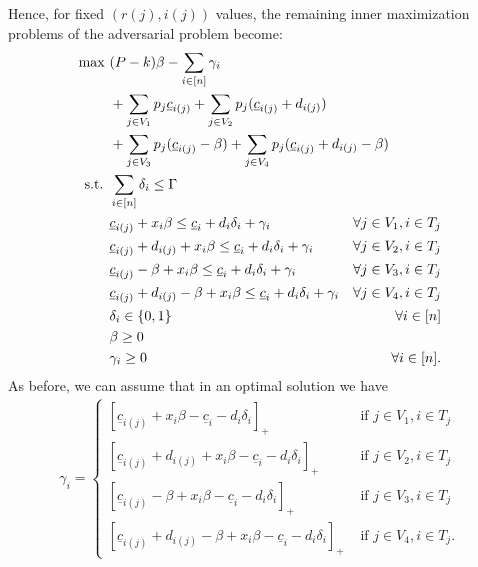 Hence, for fixed $(r(j),i(j))$ values, 
the remaining inner maximization problems of the adversarial problem become:
\begin{align}
\label{eq:complicated-rj-ij}
\max\ & (P-k)\beta - \sum_{i\in[n]} \gamma_i \\
& + \sum_{j\in V_1} p_j \underline{c}_{i(j)}
+ \sum_{j\in V_2} p_j (\underline{c}_{i(j)} + d_{i(j)}) \nonumber \\
& + \sum_{j\in V_3} p_j (\underline{c}_{i(j)} - \beta)
+ \sum_{j\in V_4} p_j (\underline{c}_{i(j)} + d_{i(j)} - \beta) \hspace{-4cm} \nonumber\\
\text{s.t. } & \sum_{i\in[n]} \delta_i \le \Gamma \nonumber\\
& \underline{c}_{i(j)} + x_i \beta \le \underline{c}_i + d_i\delta_i + \gamma_i & \forall j\in V_1, i\in T_j \nonumber\\
& \underline{c}_{i(j)} + d_{i(j)} + x_i \beta \le \underline{c}_i + d_i\delta_i + \gamma_i & \forall j\in V_2, i\in T_j \nonumber\\
& \underline{c}_{i(j)} -\beta + x_i \beta \le \underline{c}_i + d_i\delta_i + \gamma_i & \forall j\in V_3, i\in T_j \nonumber\\
& \underline{c}_{i(j)} + d_{i(j)} - \beta + x_i \beta \le \underline{c}_i + d_i\delta_i + \gamma_i & \forall j\in V_4, i\in T_j \nonumber\\
& \delta_i\in\{0,1\} & \forall i\in[n] \nonumber\\
& \beta \ge 0 \nonumber\\
& \gamma_i \ge 0 & \forall i\in[n]. \nonumber
\end{align}
As before, we can assume that in an optimal solution we have
\begin{align}
\label{eq:gamma-rj-ij}
\gamma_i = \begin{cases}
[\underline{c}_{i(j)} + x_i \beta - \underline{c}_i - d_i\delta_i]_+ & \text{ if } j\in V_1, i \in T_j \\
[\underline{c}_{i(j)} + d_{i(j)} + x_i \beta - \underline{c}_i - d_i\delta_i]_+ & \text{ if } j\in V_2, i \in T_j \\
[\underline{c}_{i(j)} -\beta + x_i \beta - \underline{c}_i - d_i\delta_i]_+ & \text{ if } j\in V_3, i \in T_j \\
[\underline{c}_{i(j)} + d_{i(j)} - \beta + x_i \beta - \underline{c}_i - d_i\delta_i]_+ & \text{ if } j\in V_4, i \in T_j. 
\end{cases}
\end{align}


